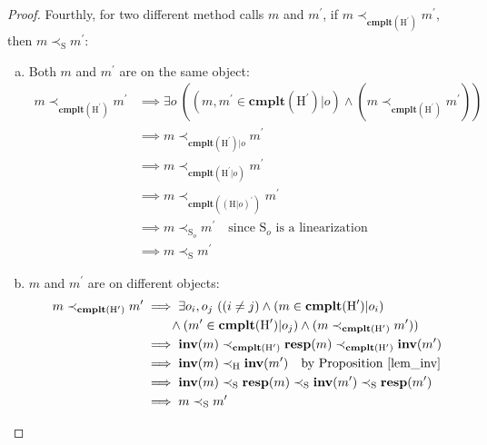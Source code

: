 \documentclass[a4paper,USenglish]{lipics-v2016}
\newcommand{\linz}{linearization}
\newcommand{\cmplt}{\textbf{cmplt}}
\newcommand{\myinv}{\textbf{inv}}
\newcommand{\myresp}{\textbf{resp}}
\newcommand{\his}{\text{H}}
\newcommand{\shis}{\text{S}}
\newcommand{\myvert}{\vert}
\begin{document}
\begin{proof}
	Fourthly, for two different method calls $m$ and $m^\prime$, if $m \prec_{\cmplt(\his^\prime)} m^\prime$, then $m \prec_{\shis} m^\prime$:
	\begin{enumerate}[(a)]
		\item
		Both $m$ and $m^\prime$ are on the same object:
		\begin{align*}
		m \prec_{\cmplt(\his^\prime)} m^\prime &\implies \exists o \ ((m, m^\prime \in \cmplt(\his^\prime) \myvert o) \land (m \prec_{\cmplt(\his^\prime)} m^\prime))\\
		&\implies m \prec_{\cmplt(\his^\prime) \myvert o} m^\prime\\
		&\implies m \prec_{\cmplt(\his^\prime \myvert o)} m^\prime\\
		&\implies m \prec_{\cmplt((\his \myvert o)^\prime)} m^\prime\\
		&\implies m \prec_{\shis_o} m^\prime \quad \text{since $\shis_o$ is a {\linz}}\\
		&\implies m \prec_{\shis} m^\prime
		\end{align*}
		\item
		$m$ and $m^\prime$ are on different objects:
		\begin{align*}
		m \prec_{\cmplt(\his^\prime)} m^\prime &\implies \exists o_i, o_j \ ((i \neq j) \land (m \in \cmplt(\his^\prime) \myvert o_i)\\
		&\qquad \land (m^\prime \in \cmplt(\his^\prime) \myvert o_j) \land (m \prec_{\cmplt(\his^\prime)} m^\prime))\\
		&\implies \myinv(m) \prec_{\cmplt(\his^\prime)} \myresp(m) \prec_{\cmplt(\his^\prime)} \myinv(m^\prime)\\
		&\implies \myinv(m) \prec_{\his} \myinv(m^\prime) \quad \text{by Proposition \ref{lem_inv}}\\
		&\implies \myinv(m) \prec_{\shis} \myresp(m) \prec_{\shis} \myinv(m^\prime) \prec_{\shis} \myresp(m^\prime)\\
		&\implies m \prec_{\shis} m^\prime
		\end{align*}
	\end{enumerate}
	

\end{proof}
\end{document}
